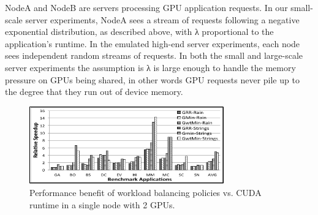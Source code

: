 NodeA and NodeB are servers processing GPU application requests. In our small-scale server experiments, NodeA sees a stream of requests following a negative exponential distribution, as described above, with λ proportional to the application’s runtime. In the emulated high-end server experiments, each node sees independent random streams of requests. In both the small and large-scale server experiments the assumption is λ is large enough to handle the memory pressure on GPUs being shared, in other words GPU requests never pile up to the degree that they run out of device memory.
\begin{figure}[t]
\centering
\includegraphics[width=0.75\textwidth,height=\textheight,keepaspectratio]{figures/strings_exp1.pdf}
\caption{Performance benefit of workload balancing policies vs. CUDA runtime in a single node with 2 GPUs.}
\label{fig:strings_exp1}
\end{figure}


